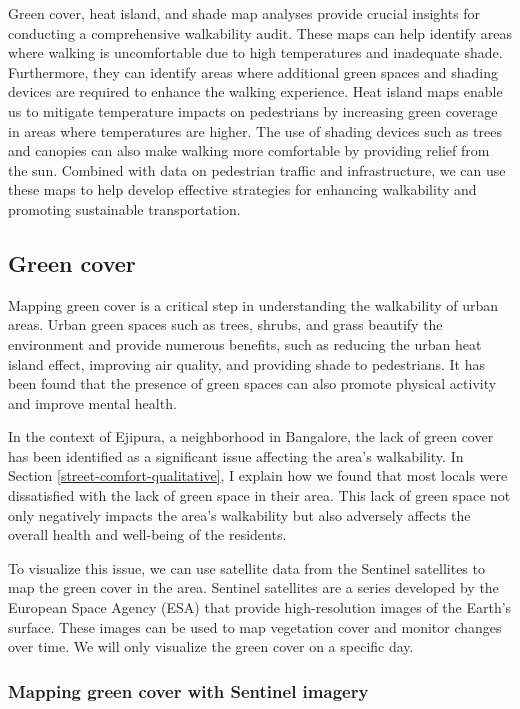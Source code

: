 \documentclass[
]{latex/krantz}
\begin{document}
Green cover, heat island, and shade map analyses provide crucial insights for conducting a comprehensive walkability audit. These maps can help identify areas where walking is uncomfortable due to high temperatures and inadequate shade. Furthermore, they can identify areas where additional green spaces and shading devices are required to enhance the walking experience. Heat island maps enable us to mitigate temperature impacts on pedestrians by increasing green coverage in areas where temperatures are higher. The use of shading devices such as trees and canopies can also make walking more comfortable by providing relief from the sun. Combined with data on pedestrian traffic and infrastructure, we can use these maps to help develop effective strategies for enhancing walkability and promoting sustainable transportation.

\hypertarget{green-cover}{%
\subsection{Green cover}\label{green-cover}}

Mapping green cover is a critical step in understanding the walkability of urban areas. Urban green spaces such as trees, shrubs, and grass beautify the environment and provide numerous benefits, such as reducing the urban heat island effect, improving air quality, and providing shade to pedestrians. It has been found that the presence of green spaces can also promote physical activity and improve mental health.

In the context of Ejipura, a neighborhood in Bangalore, the lack of green cover has been identified as a significant issue affecting the area's walkability. In Section \ref{street-comfort-qualitative}, I explain how we found that most locals were dissatisfied with the lack of green space in their area. This lack of green space not only negatively impacts the area's walkability but also adversely affects the overall health and well-being of the residents.

To visualize this issue, we can use satellite data from the Sentinel satellites to map the green cover in the area. Sentinel satellites are a series developed by the European Space Agency (ESA) that provide high-resolution images of the Earth's surface. These images can be used to map vegetation cover and monitor changes over time. We will only visualize the green cover on a specific day.

\hypertarget{sentinel-guide}{%
\subsubsection{Mapping green cover with Sentinel imagery}\label{sentinel-guide}}
\end{document}
